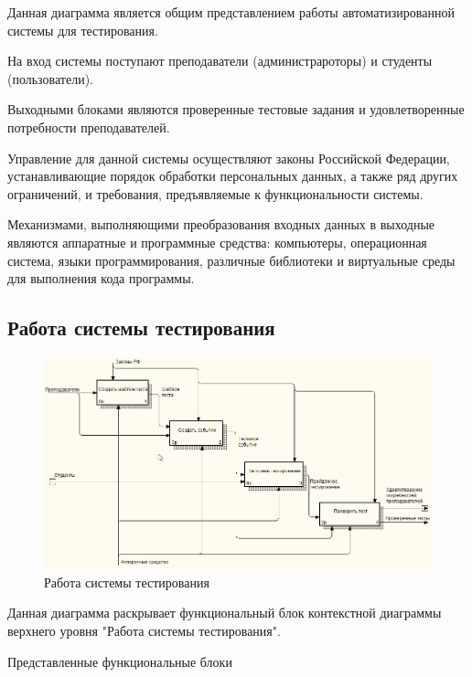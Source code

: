 \documentclass{article}
\begin{document}
    Данная диаграмма является общим представлением работы автоматизированной
    системы для тестирования.

    На вход системы поступают преподаватели (администрароторы) и студенты
    (пользователи).

    Выходными блоками являются проверенные тестовые задания и удовлетворенные
    потребности преподавателей.

    Управление для данной системы осуществляют законы Российской Федерации,
    устанавливающие порядок обработки персональных данных, а также ряд других
    ограничений, и требования, предъявляемые к функциональности системы.

    Механизмами, выполняющими преобразования входных данных в выходные являются
    аппаратные и программные средства: компьютеры, операционная система,
    языки программирования, различные библиотеки и виртуальные среды для
    выполнения кода программы.

    \subsection{Работа системы тестирования}
    \begin{figure}[H]
        \includegraphics[width=\textwidth, center]{../img/idef0/context_decompose.png}
        \caption{Работа системы тестирования}
    \end{figure}

    Данная диаграмма раскрывает функциональный блок контекстной
    диаграммы верхнего уровня "Работа системы тестирования".

    Представленные функциональные блоки
\end{document}
